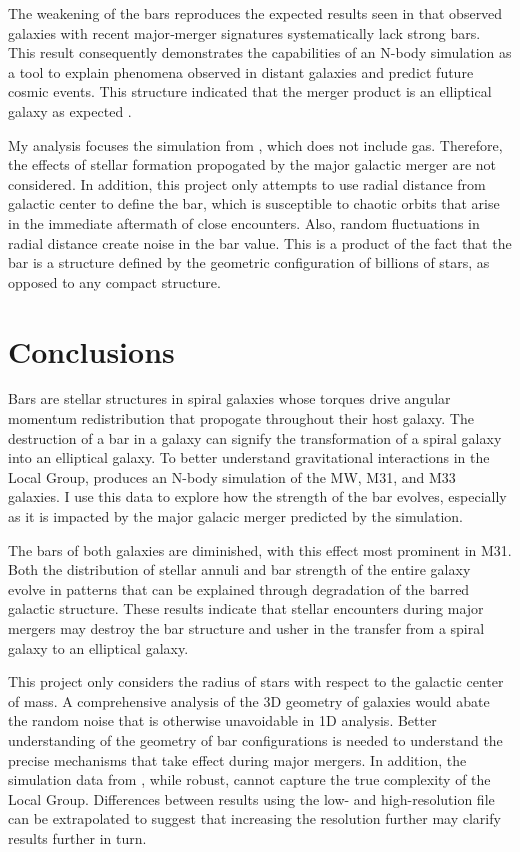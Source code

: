 \documentclass[twocolumn]{aastex631}
\begin{document}
The weakening of the bars reproduces the expected results seen in
\citet{elmegreen:07} that observed galaxies with recent major‐merger
signatures systematically lack strong bars. This result consequently
demonstrates the capabilities of an N-body simulation as a tool to
explain phenomena observed in distant galaxies and predict future
cosmic events. This structure indicated that the
merger product is an elliptical galaxy as expected
\citep[e.g.,][]{mutch:11}.

My analysis focuses the simulation from \citet{vandermarel:12}, which
does not include gas. Therefore, the effects of stellar formation
propogated by the major galactic merger are not considered. In
addition, this project only attempts to use radial distance from
galactic center to define the bar, which is susceptible to chaotic
orbits that arise in the immediate aftermath of close
encounters. Also, random fluctuations in radial distance create noise
in the bar value. This is a product of the fact that the bar is a
structure defined by the geometric configuration of billions of stars,
as opposed to any compact structure.

\section{Conclusions}

Bars are stellar structures in spiral galaxies whose torques drive
angular momentum redistribution that propogate throughout their host
galaxy. The destruction of a bar in a galaxy can signify the
transformation of a spiral galaxy into an elliptical galaxy. To better
understand gravitational interactions in the Local Group,
\citet{vandermarel:12} produces an N-body simulation of the MW, M31,
and M33 galaxies. I use this data to explore how the strength of the
bar evolves, especially as it is impacted by the major galacic merger
predicted by the simulation.

The bars of both galaxies are diminished, with this effect most
prominent in M31.  Both the distribution of stellar annuli and bar
strength of the entire galaxy evolve in patterns that can be explained
through degradation of the barred galactic structure. These results
indicate that stellar encounters during major mergers may destroy the
bar structure and usher in the transfer from a spiral galaxy to an
elliptical galaxy.

This project only considers the radius of stars with respect to the
galactic center of mass. A comprehensive analysis of the 3D geometry
of galaxies would abate the random noise that is otherwise unavoidable
in 1D analysis. Better understanding of the geometry of bar
configurations is needed to understand the precise mechanisms that
take effect during major mergers. In addition, the simulation data
from \citet{vandermarel:12}, while robust, cannot capture the true
complexity of the Local Group. Differences between results using the
low- and high-resolution file can be extrapolated to suggest that
increasing the resolution further may clarify results further in turn.
\end{document}
